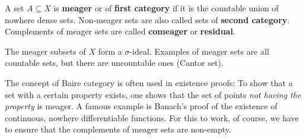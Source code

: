 \begin{definition}\label{def-meager}A set $A \subseteq X$ is \textbf{meager} or of \textbf{first category} if it is the countable union of nowhere dense sets. Non-meager sets are also called sets of \textbf{second category}. Complements of meager sets are called \textbf{comeager} or \textbf{residual}.

\end{definition}The meager subsets of $X$ form a $\sigma$-ideal. Examples of meager sets are all countable sets, but there are uncountable ones (Cantor set).

The concept of Baire category is often used in existence proofs: To show that a set with a certain property exists, one shows that the set of points \textit{not having the property} is meager. A famous example is Banach's proof of the existence of continuous, nowhere differentiable functions. For this to work, of course, we have to ensure that the complements of meager sets are non-empty.

